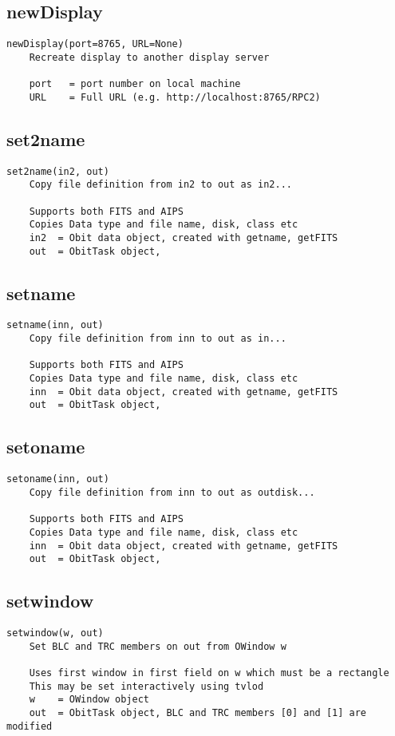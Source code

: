 \documentclass[11pt]{report}
\begin{document}
\subsection{newDisplay}
\begin{verbatim}
newDisplay(port=8765, URL=None)
    Recreate display to another display server
    
    port   = port number on local machine
    URL    = Full URL (e.g. http://localhost:8765/RPC2)
\end{verbatim}

\subsection{set2name}
\begin{verbatim}
set2name(in2, out)
    Copy file definition from in2 to out as in2...
    
    Supports both FITS and AIPS
    Copies Data type and file name, disk, class etc
    in2  = Obit data object, created with getname, getFITS
    out  = ObitTask object,
\end{verbatim}

\subsection{setname}
\begin{verbatim}
setname(inn, out)
    Copy file definition from inn to out as in...
    
    Supports both FITS and AIPS
    Copies Data type and file name, disk, class etc
    inn  = Obit data object, created with getname, getFITS
    out  = ObitTask object,
\end{verbatim}

\subsection{setoname}
\begin{verbatim}
setoname(inn, out)
    Copy file definition from inn to out as outdisk...
    
    Supports both FITS and AIPS
    Copies Data type and file name, disk, class etc
    inn  = Obit data object, created with getname, getFITS
    out  = ObitTask object,
\end{verbatim}

\subsection{setwindow}
\begin{verbatim}
setwindow(w, out)
    Set BLC and TRC members on out from OWindow w
    
    Uses first window in first field on w which must be a rectangle
    This may be set interactively using tvlod
    w    = OWindow object
    out  = ObitTask object, BLC and TRC members [0] and [1] are modified
\end{verbatim}
\end{document}

